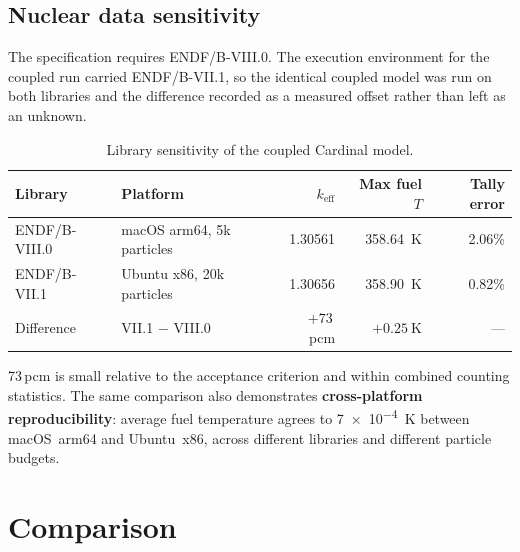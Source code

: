\documentclass[11pt,a4paper]{article}
\newcommand{\keff}{\ensuremath{k_{\mathrm{eff}}}}
\newcommand{\pcm}{\,pcm}
\begin{document}
\subsection{Nuclear data sensitivity}
The specification requires ENDF/B-VIII.0. The execution environment for the coupled run
carried ENDF/B-VII.1, so the identical coupled model was run on both libraries and the
difference recorded as a measured offset rather than left as an unknown.

\begin{table}[H]\centering\small
\caption{Library sensitivity of the coupled Cardinal model.}
\begin{tabular}{@{}llrrr@{}}
\toprule
\textbf{Library} & \textbf{Platform} & \textbf{\keff} & \textbf{Max fuel $T$} & \textbf{Tally error}\\
\midrule
ENDF/B-VIII.0 & macOS arm64, 5k particles & 1.30561 & \SI{358.64}{\kelvin} & 2.06\%\\
ENDF/B-VII.1 & Ubuntu x86, 20k particles & 1.30656 & \SI{358.90}{\kelvin} & 0.82\%\\
\midrule
\rowcolor{rowbg}
Difference & VII.1 $-$ VIII.0 & $+73$\pcm & $+\SI{0.25}{\kelvin}$ & ---\\
\bottomrule
\end{tabular}
\end{table}

\SI{73}{}\pcm{} is small relative to the acceptance criterion and within combined counting
statistics. The same comparison also demonstrates \textbf{cross-platform reproducibility}:
average fuel temperature agrees to \SI{7e-4}{\kelvin} between macOS~arm64 and Ubuntu~x86,
across different libraries and different particle budgets.

\newpage
\section{Comparison}\label{sec:comp}
\end{document}
